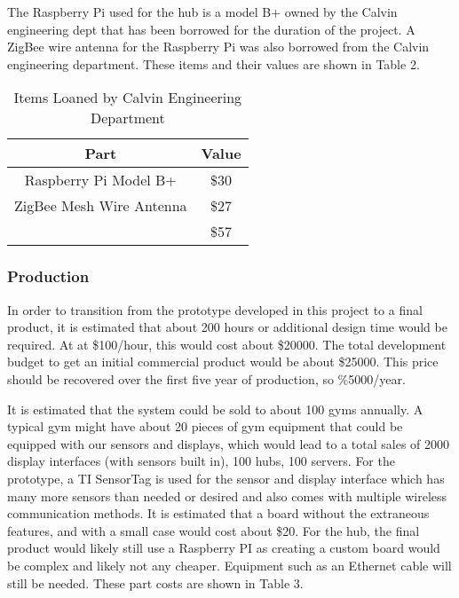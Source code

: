 \documentclass[ppfs.tex]{template/subfiles}
\begin{document}
        The Raspberry Pi used for the hub is a model B+ owned by the Calvin engineering dept that has been borrowed for the duration of the project. A ZigBee wire antenna for the Raspberry Pi was also borrowed from the Calvin engineering department. These items and their values are shown in Table 2.
        
        \begin{table}[h!]
        	\begin{center}
        		\caption{Items Loaned by Calvin Engineering Department}
        		\label{tab:table2}
        		\begin{tabular}{|c|c|}
        			\hline
        			Part & Value\\
        			\hline
        			Raspberry Pi Model B+ & \$30 \\
        			\hline
        			ZigBee Mesh Wire Antenna & \$27 \\
        			\hline
        			& \$57\\
        			\hline
        		\end{tabular}
        	\end{center}
        \end{table}
        \subsubsection{Production}
        
        In order to transition from the prototype developed in this project to a final product, it is estimated that about 200 hours or additional design time would be required. At at \$100/hour, this would cost about \$20000. The total development budget to get an initial commercial product would be about \$25000. This price should be recovered over the first five year of production, so \%5000/year.
        
        It is estimated that the system could be sold to about 100 gyms annually. A typical gym might have about 20 pieces of gym equipment that could be equipped with our sensors and displays, which would lead to a total sales of 2000 display interfaces (with sensors built in), 100 hubs, 100 servers. 
        For the prototype, a TI SensorTag is used for the sensor and display interface which has many more sensors than needed or desired and also comes with multiple wireless communication methods. It is estimated that a board without the extraneous features, and with a small case would cost about \$20.
        For the hub, the final product would likely still use a Raspberry PI as creating a custom board would be complex and likely not any cheaper. Equipment such as an Ethernet cable will still be needed.
        These part costs are shown in Table 3.
        
\end{document}
